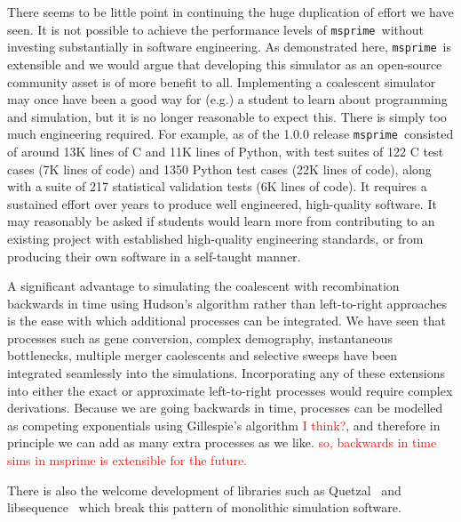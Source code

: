 \documentclass{article}
\newcommand{\msprime}[0]{\texttt{msprime}}
\newcommand{\jkcomment}[1]{\textcolor{red}{#1}}
\begin{document}

There seems to be little point in continuing the huge duplication of effort we
have seen. It is not possible to achieve the performance levels of \msprime\
without investing substantially in software engineering. As demonstrated here,
\msprime\ is extensible and we would argue that developing this simulator as an
open-source community asset is of more benefit to all. Implementing a
coalescent simulator may once have been a good way for (e.g.) a student to
learn about programming and simulation, but it is no longer reasonable to
expect this. There is simply too much engineering required. For example, as of
the 1.0.0 release \msprime\ consisted of around 13K lines of C and 11K
lines of Python, with test suites of 122 C test cases (7K lines of code) and
1350 Python test cases (22K lines of code), along with a suite of 217
statistical validation tests (6K lines of code). It requires a sustained effort
over years to produce well engineered, high-quality software. It may reasonably
be asked if students would learn more from contributing to an existing project
with established high-quality engineering standards, or from producing their own
software in a self-taught manner.

A significant advantage to simulating the coalescent with recombination
backwards in time using Hudson's algorithm rather than
left-to-right
approaches~\citep{wiuf1999recombination,chen2009fast,staab2015scrm}
is the ease with which additional processes can be integrated.
We have seen that processes such as gene conversion, complex
demography, instantaneous bottlenecks, multiple merger caolescents
and selective sweeps have been integrated seamlessly into
the simulations. Incorporating any of these extensions into
either the exact or approximate left-to-right processes would require
complex derivations. Because we are going backwards
in time, processes can be modelled as competing exponentials
using Gillespie's algorithm \jkcomment{I think?},
and therefore in principle we can
add as many extra processes as we like.
\jkcomment{so, backwards in time
sims in msprime is extensible for the future.}


There is also the welcome development of libraries such as
Quetzal~\citep{becheler2019quetzal} and libsequence~\citep{thornton2014cpp}
which break this pattern of monolithic simulation software.
\end{document}
